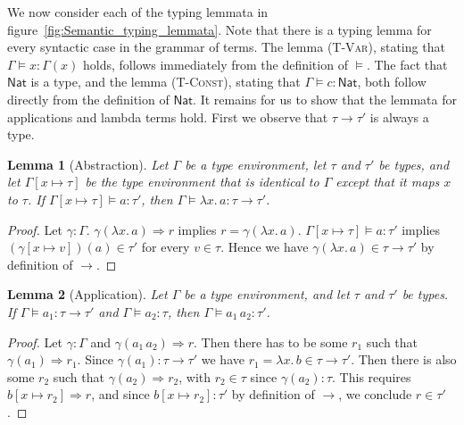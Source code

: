 \documentclass[12pt,a4paper]{article}
\theoremstyle{definition}
\theoremstyle{plain}
\newtheorem{lemma}{Lemma}
\newcommand{\abstr}[2]{\ensuremath{\lambda{#1}.\,{#2}}}
\newcommand{\app}[2]{\ensuremath{{#1}\,{#2}}}
\newcommand{\Nat}{\ensuremath{\mathsf{Nat}}}
\begin{document}
We now consider each of the typing lemmata in figure~\ref{fig:Semantic_typing_lemmata}. Note
that there is a typing lemma for every syntactic case in the grammar of terms. The lemma
\textsc{(T-Var)}, stating that $\Gamma \models x : \Gamma(x)$ holds, follows immediately from
the definition of $\models$. The fact that $\Nat$ is a type, and the lemma \textsc{(T-Const)},
stating that $\Gamma \models c : \Nat$, both follow directly from the definition of $\Nat$.
It remains for us to show that the lemmata for applications and lambda terms hold.
First we observe that $\tau \to \tau'$ is always a type.

\begin{lemma}[Abstraction]
  Let $\Gamma$ be a type environment, let $\tau$ and $\tau'$ be types, and let
  $\Gamma[x \mapsto \tau]$ be the type environment that is identical to
  $\Gamma$ except that it maps $x$ to $\tau$. If $\Gamma[x \mapsto \tau] \models a : \tau'$,
  then $\Gamma \models \abstr{x}{a} : \tau \to \tau'$.
\end{lemma}

\begin{proof}
  Let $\gamma : \Gamma$. $\gamma(\abstr{x}{a}) \Rightarrow r$ implies $r = \gamma(\abstr{x}{a})$.
  $\Gamma[x \mapsto \tau] \models a : \tau'$ implies $(\gamma[x \mapsto v])(a) \in \tau'$ for
  every $v \in \tau$. Hence we have $\gamma(\abstr{x}{a}) \in \tau \to \tau'$ by definition of $\to$.
\end{proof}

\begin{lemma}[Application]
  Let $\Gamma$ be a type environment, and let $\tau$ and $\tau'$ be types.
  If $\Gamma \models a_1 : \tau \to \tau'$ and $\Gamma \models a_2 : \tau$,
  then $\Gamma \models \app{a_1}{a_2} : \tau'$.
\end{lemma}

\begin{proof}
  Let $\gamma : \Gamma$ and $\gamma(\app{a_1}{a_2}) \Rightarrow r$. Then there has to be some $r_1$
  such that $\gamma(a_1) \Rightarrow r_1$. Since $\gamma(a_1) : \tau \to \tau'$ we have
  $r_1 = \abstr{x}{b} \in \tau \to \tau'$. Then there is also some $r_2$ such that $\gamma(a_2) \Rightarrow r_2$,
  with $r_2 \in \tau$ since $\gamma(a_2) : \tau$. This requires $b[x \mapsto r_2] \Rightarrow r$,
  and since $b[x \mapsto r_2] : \tau'$ by definition of $\to$, we conclude $r \in \tau'$.
\end{proof}
\end{document}

